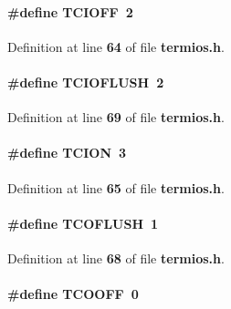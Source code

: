 \paragraph[{T\+C\+I\+O\+FF}]{\setlength{\rightskip}{0pt plus 5cm}\#define T\+C\+I\+O\+FF~2}\label{termios_8h_a227fea9e0767c2a418967e87f2fc222d}


Definition at line {\bf 64} of file {\bf termios.\+h}.

\paragraph[{T\+C\+I\+O\+F\+L\+U\+SH}]{\setlength{\rightskip}{0pt plus 5cm}\#define T\+C\+I\+O\+F\+L\+U\+SH~2}\label{termios_8h_a101bfc62e2af02c05dde40905aa47c1b}


Definition at line {\bf 69} of file {\bf termios.\+h}.

\paragraph[{T\+C\+I\+ON}]{\setlength{\rightskip}{0pt plus 5cm}\#define T\+C\+I\+ON~3}\label{termios_8h_a9dea2092d0f68fc2a0a9ba2159523667}


Definition at line {\bf 65} of file {\bf termios.\+h}.

\paragraph[{T\+C\+O\+F\+L\+U\+SH}]{\setlength{\rightskip}{0pt plus 5cm}\#define T\+C\+O\+F\+L\+U\+SH~1}\label{termios_8h_a13190138439fcec2c985e2822df02b4c}


Definition at line {\bf 68} of file {\bf termios.\+h}.

\paragraph[{T\+C\+O\+O\+FF}]{\setlength{\rightskip}{0pt plus 5cm}\#define T\+C\+O\+O\+FF~0}\label{termios_8h_a469b6bf3b2c9ee9866d1270dd640458b}


